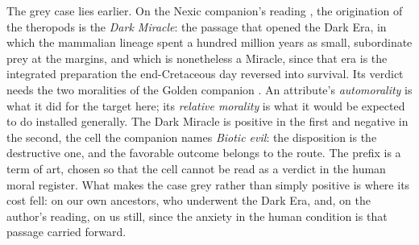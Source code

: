 
The grey case lies earlier. On the Nexic companion's reading \cite{Nexus},
the origination of the theropods is the \emph{Dark Miracle}: the passage
that opened the Dark Era, in which the mammalian lineage spent a hundred
million years as small, subordinate prey at the margins, and which is
nonetheless a Miracle, since that era is the integrated preparation the
end-Cretaceous day reversed into survival. Its verdict needs the two
moralities of the Golden companion \cite{GoldenReasoning}. An attribute's
\emph{automorality} is what it did for the target here; its \emph{relative
morality} is what it would be expected to do installed generally. The Dark
Miracle is positive in the first and negative in the second, the cell the
companion names \emph{Biotic evil}: the disposition is the destructive one,
and the favorable outcome belongs to the route. The prefix is a term of art,
chosen so that the cell cannot be read as a verdict in the human moral
register. What makes the case grey rather than simply positive is where its
cost fell: on our own ancestors, who underwent the Dark Era, and, on the
author's reading, on us still, since the anxiety in the human condition is
that passage carried forward.

